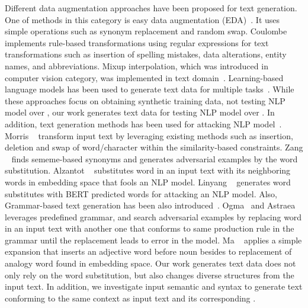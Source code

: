 %
Different data augmentation approaches have been proposed for text
generation. One of methods in this category is easy data augmentation
(EDA)~\cite{weizou2019eda}. It uses simple operations such as synonym
replacement and random swap. Coulombe~\cite{coulombe2018textaugapi}
implements rule-based transformations using regular expressions for
text transformations such as insertion of spelling mistakes, data
alterations, entity names, and abbreviations. Mixup interpolation,
which was introduced in computer vision category, was implemented in
text domain~\cite{hongyu2019dataaugmixup}. Learning-based language
models has been used to generate text data for multiple
tasks~\cite{qizhe2019unsupdataaug, ateret2019lambda}. While these
approaches focus on obtaining synthetic training data, not testing NLP
model over \lcs,
our work generates text data for testing NLP model over \lcs.  In
addition, text generation methods has been used for attacking NLP
model~\cite{morris2020textattack,zang2020sememepso,alzantot2018genadvexp,linyang2020bertattack}.
Morris \textit{\etal}~\cite{morris2020textattack} transform input text
by leveraging existing methods such as insertion, deletion and swap of
word/character within the similarity-based
constraints. Zang \textit{\etal}~\cite{zang2020sememepso} finds
sememe-based synonyms and generates adversarial examples by the word
substitution. Alzantot \textit{\etal}~\cite{alzantot2018genadvexp}
substitutes word in an input text with its neighboring words in
embedding space that fools an NLP
model. Linyang \textit{\etal}~\cite{linyang2020bertattack} generates
word substitutes with BERT predicted words for attacking an NLP
model. Also, Grammar-based text generation has been also
introduced~\cite{udeshi2019ogma,soremekun2020astraea,maIJCAI2020mtnlp}.
Ogma~\cite{udeshi2019ogma} and Astraea~\cite{soremekun2020astraea}
leverages predefined grammar, and search adversarial examples by
replacing word in an input text with another one that conforms to same
production rule in the grammar until the replacement leads to error in
the model. Ma \textit{\etal}~\cite{maIJCAI2020mtnlp} applies a simple
expansion that inserts an adjective word before noun besides to
replacement of analogy word found in embedding space. Our work
generates text data does not only rely on the word substitution, but
also changes diverse structures from the input text. In addition, we
investigate input semantic and syntax to generate text conforming to
the same context as input text and its corresponding \lc.

